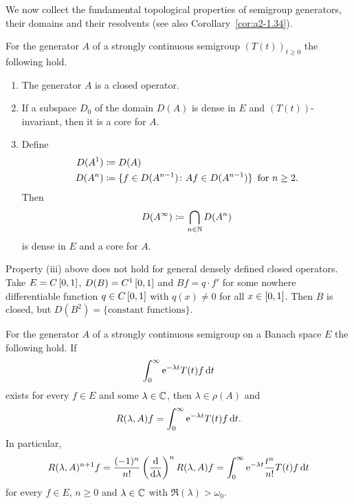 We now collect the fundamental topological properties of semigroup generators, their domains and their resolvents
(see also Corollary~\ref{cor:a2-1.34}).
\begin{proposition}\label{prop:a1-1.9}
For the generator $A$ of a strongly continuous semigroup $(T(t))_{t \geq 0}$ the following hold.
\begin{enumerate}[\upshape(i)]
\item 
The generator $A$ is a closed operator.

\item
If a subspace $D_{0}$ of the domain $D(A)$ is dense in $E$ and $(T(t))$-invariant, then it is a core for $A$.
\item Define 
%
\begin{align*}
	D(A^{1}) & \coloneq D(A) \\
	D(A^{n}) & \coloneq \{f \in D(A^{n-1}) \colon Af \in D(A^{n-1})\} \, \text{ for $ n \geq 2 $.}
\end{align*}
%
Then %
\[
	D(A^{\infty}) \coloneq \bigcap_{n \in \mathbb{N}} D(A^{n})
\]
%
is dense in $E$ and a core for $A$.
\end{enumerate}
\end{proposition}
\begin{example}\label{ex:a1-1.10}
Property (iii) above does not hold for general densely defined closed operators.
Take $E = C\left[ 0,1 \right]$, $D(B) = C^{1}\left[ 0,1 \right]$ and $Bf = q \cdot f'$ for some nowhere differentiable function $q \in C\left[ 0,1 \right]$ with $q(x) \neq 0$ for all $x \in \left[ 0,1 \right]$.
Then $B$ is closed, but $D(B^{2}) = \{\text{constant functions}\}$.
\end{example}
\begin{proposition}\label{prop:a1-1.11}
For the generator $A$ of a strongly continuous semigroup on a Banach space $E$ the following hold.
If %
\[
	 \int_{0}^{\infty}  \mathrm{e}^{-\lambda t}T(t)f \mathop{}\!\mathrm{d}{t} 
\]
%
exists for every $f \in E$ and some $\lambda \in \mathbb{C}$, then $\lambda \in \rho(A)$ and 
%
\[
	R(\lambda,A)f = \int_{0}^{\infty}  \mathrm{e}^{-\lambda t}T(t)f  \mathop{}\!\mathrm{d}{t}.
\]
%
In particular,
\begin{equation}\label{eq:a1-1.7}
R(\lambda,A)^{n+1}f 
	= \frac{(-1)^{n}}{n!}\left(\frac{\mathop{}\!\mathrm{d}{ }}{\mathop{}\!\mathrm{d}{\lambda}}\right)^{n} R(\lambda,A)f 
	= \int_{0}^{\infty}  \mathrm{e}^{-\lambda t}\frac{t^{n}}{n!}T(t)f  \mathop{}\!\mathrm{d}{t}
\end{equation}
for every $f \in E$, $n \geq 0$ and $\lambda \in \mathbb{C}$ with $\Re(\lambda) > \omega_{0}$.
\end{proposition}
